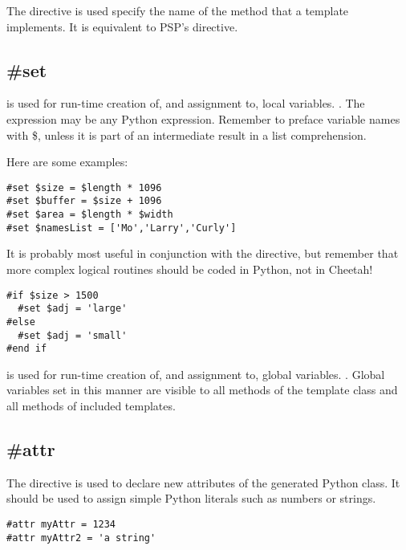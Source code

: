The  directive is used specify the name of the method that a
template implements.  It is equivalent to PSP's  directive.


\subsection{\#set}
\label{inheritanceEtc.set}

 is used for run-time creation of, and assignment to, local
variables.  . The expression may be any Python
expression. Remember to preface variable names with \$, unless it is part of an
intermediate result in a list comprehension.

Here are some examples:
\begin{verbatim}
#set $size = $length * 1096
#set $buffer = $size + 1096
#set $area = $length * $width
#set $namesList = ['Mo','Larry','Curly']
\end{verbatim}

It is probably most useful in conjunction with the  directive, but
remember that more complex logical routines should be coded in Python, not in
Cheetah!
\begin{verbatim}
#if $size > 1500
  #set $adj = 'large'
#else
  #set $adj = 'small'
#end if
\end{verbatim}

 is used for run-time creation of, and assignment to, global
variables. . Global variables set in this
manner are visible to all methods of the template class and all methods of
included templates.


\subsection{\#attr}
\label{inheritanceEtc.attr}

The  directive is used to declare new attributes of the generated Python
class.  It should be used to assign simple Python literals such as numbers or
strings.  

\begin{verbatim}
#attr myAttr = 1234
#attr myAttr2 = 'a string'
\end{verbatim}


